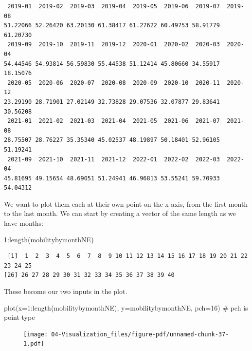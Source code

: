 \documentclass[
  letterpaper,
  DIV=11,
  numbers=noendperiod]{scrreprt}
\newenvironment{Shaded}{\begin{snugshade}}{\end{snugshade}}
\newcommand{\AttributeTok}[1]{\textcolor[rgb]{0.40,0.45,0.13}{#1}}
\newcommand{\CommentTok}[1]{\textcolor[rgb]{0.37,0.37,0.37}{#1}}
\newcommand{\DecValTok}[1]{\textcolor[rgb]{0.68,0.00,0.00}{#1}}
\newcommand{\FunctionTok}[1]{\textcolor[rgb]{0.28,0.35,0.67}{#1}}
\newcommand{\NormalTok}[1]{\textcolor[rgb]{0.00,0.23,0.31}{#1}}
\newcommand{\SpecialCharTok}[1]{\textcolor[rgb]{0.37,0.37,0.37}{#1}}
\begin{document}
\begin{verbatim}
 2019-01  2019-02  2019-03  2019-04  2019-05  2019-06  2019-07  2019-08 
51.22066 52.26420 63.20130 61.38417 61.27622 60.49753 58.91779 61.20730 
 2019-09  2019-10  2019-11  2019-12  2020-01  2020-02  2020-03  2020-04 
54.44546 54.93814 56.59830 55.44538 51.12414 45.80660 34.55917 18.15076 
 2020-05  2020-06  2020-07  2020-08  2020-09  2020-10  2020-11  2020-12 
23.29190 28.71901 27.02149 32.73828 29.07536 32.07877 29.83641 30.56208 
 2021-01  2021-02  2021-03  2021-04  2021-05  2021-06  2021-07  2021-08 
28.75507 28.76227 35.35340 45.02537 48.19897 50.18401 52.96105 51.19241 
 2021-09  2021-10  2021-11  2021-12  2022-01  2022-02  2022-03  2022-04 
45.81695 49.15654 48.69051 51.24941 46.96813 53.55241 59.70933 54.04312 
\end{verbatim}

We want to plot them each at their own point on the x-axis, from the
first month to the last month. We can start by creating a vector of the
same length as we have months:

\begin{Shaded}
\begin{Highlighting}[]
\DecValTok{1}\SpecialCharTok{:}\FunctionTok{length}\NormalTok{(mobilitybymonthNE)}
\end{Highlighting}
\end{Shaded}

\begin{verbatim}
 [1]  1  2  3  4  5  6  7  8  9 10 11 12 13 14 15 16 17 18 19 20 21 22 23 24 25
[26] 26 27 28 29 30 31 32 33 34 35 36 37 38 39 40
\end{verbatim}

These become our two inputs in the plot.

\begin{Shaded}
\begin{Highlighting}[]
\FunctionTok{plot}\NormalTok{(}\AttributeTok{x=}\DecValTok{1}\SpecialCharTok{:}\FunctionTok{length}\NormalTok{(mobilitybymonthNE),}
     \AttributeTok{y=}\NormalTok{mobilitybymonthNE, }\AttributeTok{pch=}\DecValTok{16}\NormalTok{) }\CommentTok{\# pch is point type}
\end{Highlighting}
\end{Shaded}

\begin{figure}[H]

{\centering \texttt{[image: 04-Visualization\_files/figure-pdf/unnamed-chunk-37-1.pdf]}

}

\end{figure}
\end{document}

